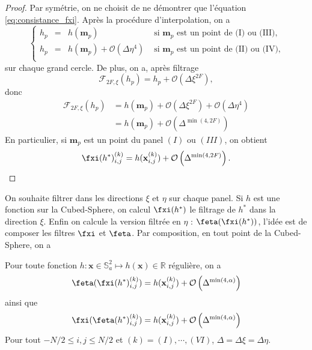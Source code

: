 \begin{proof}
Par symétrie, on ne choisit de ne démontrer que l'équation \eqref{eq:consistance_fxi}.
Après la procédure d'interpolation, on a 
\begin{equation}
\left\lbrace
\begin{array}{rccl}
h_p & = & h(\mathbf{m}_p) & \text{ si } \mathbf{m}_p \text{ est un point de (I) ou (III),} \\ 
h_p & = & h(\mathbf{m}_p) + \mathcal{O}(\Delta \eta^4) & \text{ si } \mathbf{m}_p \text{ est un point de (II) ou (IV),} \\ 
\end{array}
\right.
\end{equation} 
sur chaque grand cercle. De plus, on a, après filtrage
\begin{equation}
\mathcal{F}_{2F,\xi}(h_p) = h_p + \mathcal{O}(\Delta \xi^{2F}),
\end{equation}
donc
\begin{align*}
\mathcal{F}_{2F,\xi}(h_p) & = h(\mathbf{m}_p) + \mathcal{O}(\Delta \xi^{2F}) + \mathcal{O}(\Delta \eta^4) \\
	& = h(\mathbf{m}_p) + \mathcal{O}\left( \Delta^{\min(4,2F)} \right)
\end{align*}
En particulier, si $\mathbf{m}_p$ est un point du panel $(I)$ ou $(III)$, on obtient
\begin{equation}
\fxi(h^*)_{i,j}^{(k)} = h(\mathbf{x}_{i,j}^{(k)}) + \mathcal{O}\left( \Delta^{\min(4,2F)} \right).
\end{equation}
\end{proof}

On souhaite filtrer dans les directions $\xi$ et $\eta$ sur chaque panel. Si $h$ est une fonction sur la Cubed-Sphere, on calcul $\fxi(h^*)$ le filtrage de $h^*$ dans la direction $\xi$. Enfin on calcule la version filtrée en $\eta$ : $\feta( \fxi(h^*))$, l'idée est de composer les filtres $\fxi$ et $\feta$. Par composition, en tout point de la Cubed-Sphere, on a 

\begin{proposition}
Pour toute fonction $h : \mathbf{x} \in \mathbb{S}_a^2 \mapsto h(\mathbf{x}) \in \mathbb{R}$ régulière, on a 
\begin{equation}
\feta(\fxi(h^*)_{i,j}^{(k)}) = h(\mathbf{x}_{i,j}^{(k)}) + \mathcal{O}\left( \Delta^{\min(4,\alpha)} \right)
\label{eq:consistance_ftretaxi_comp}
\end{equation}
ainsi que
\begin{equation}
\fxi(\feta(h^*)_{i,j}^{(k)}) = h(\mathbf{x}_{i,j}^{(k)}) + \mathcal{O}\left( \Delta^{\min(4,\alpha)} \right)
\label{eq:consistance_ftrxieta_comp}
\end{equation}
Pour tout $-N/2 \leq i,j \leq N/2$ et $(k) = (I), \cdots , (VI)$, $\Delta = \Delta \xi = \Delta \eta$.
\label{prop:consistance_ftrxieta_comp}
\end{proposition}

